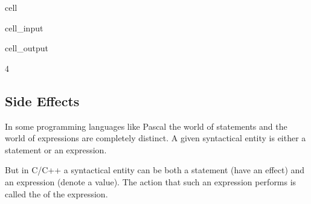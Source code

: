 \documentclass[a4paper,10pt,english]{jupyterBook}
\begin{document}
\begin{sphinxuseclass}{cell}\begin{sphinxVerbatimInput}

\begin{sphinxuseclass}{cell_input}
\begin{sphinxVerbatim}[commandchars=\\\{\}]
\end{sphinxVerbatim}

\end{sphinxuseclass}\end{sphinxVerbatimInput}
\begin{sphinxVerbatimOutput}

\begin{sphinxuseclass}{cell_output}
\begin{sphinxVerbatim}[commandchars=\\\{\}]
4
\end{sphinxVerbatim}

\end{sphinxuseclass}\end{sphinxVerbatimOutput}

\end{sphinxuseclass}

\subsection{Side Effects}
\label{\detokenize{text/progtut/statements:side-effects}}
\sphinxAtStartPar
In some programming languages like Pascal the world of statements and the world of expressions are completely distinct. A given syntactical entity is either a statement or an expression.

\sphinxAtStartPar
But in C/C++ a syntactical entity can be both a statement (have an effect) and an expression (denote a value).
The action that such an expression performs is called the  of the expression.
\end{document}

